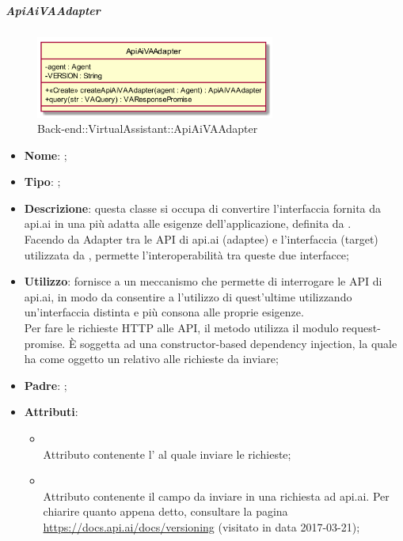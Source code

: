 \hypertarget{ApiAiVAAdapter_label}{\subparagraph{ApiAiVAAdapter}}
\begin{figure}[h]
	\centering
	\includegraphics[width=0.70\textwidth,height=\textheight,keepaspectratio]{images/ClassApiAiVAAdapter.png}
	\caption{Back-end::VirtualAssistant::ApiAiVAAdapter}
\end{figure}
\begin{itemize}
	\item \textbf{Nome}: ;
	\item \textbf{Tipo}: ;
	\item \textbf{Descrizione}: questa classe si occupa di convertire l'interfaccia fornita da api.ai in una più adatta alle esigenze dell'applicazione, definita da . \\
Facendo da Adapter tra le API di api.ai (adaptee) e l'interfaccia  (target) utilizzata da , permette l'interoperabilità tra queste due interfacce;
	\item \textbf{Utilizzo}: fornisce a  un meccanismo che permette di interrogare le API di api.ai, in modo da consentire a  l'utilizzo di quest'ultime utilizzando un'interfaccia distinta e più consona alle proprie esigenze. \\ Per fare le richieste HTTP alle API, il metodo  utilizza il modulo request-promise.
È soggetta ad una constructor-based dependency injection, la quale ha come oggetto un  relativo alle richieste da inviare;
	\item \textbf{Padre}: ;
	\item \textbf{Attributi}:
	\begin{itemize}
		\item[]  \\
		Attributo contenente l' al quale inviare le richieste;
		\item[]  \\
		Attributo contenente il campo  da inviare in una richiesta ad api.ai. Per chiarire quanto appena detto, consultare la pagina \url{https://docs.api.ai/docs/versioning}  (visitato in data 2017-03-21);

\end{itemize}
\end{itemize}
